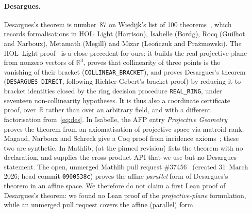 \documentclass[11pt]{article}
\theoremstyle{definition}
\theoremstyle{remark}
\newcommand{\lean}[1]{\texttt{#1}}
\newcommand{\RR}{\mathbb{R}}
\begin{document}
\paragraph{Desargues.} Desargues's theorem is number~87 on Wiedijk's list of 100
theorems~\cite{Wiedijk100}, which records formalisations in HOL~Light (Harrison), Isabelle (Bordg),
Rocq (Guilhot and Narboux), Metamath (Megill) and Mizar (Leo\'nczuk and Pra\.zmowski). The
HOL~Light proof~\cite{HOLDesargues} is a close precedent for ours: it builds the real projective
plane from nonzero vectors of $\RR^3$, proves that collinearity of three points is the vanishing
of their bracket (\lean{COLLINEAR\_BRACKET}), and proves Desargues's theorem
(\lean{DESARGUES\_DIRECT}, following Richter-Gebert's bracket proof) by reducing it to bracket
identities closed by the ring decision procedure \lean{REAL\_RING}, under seventeen
non-collinearity hypotheses. It is thus also a coordinate certificate proof, over~$\RR$ rather
than over an arbitrary field, and with a different factorisation from~\eqref{eq:des}. In Isabelle,
the AFP entry \emph{Projective Geometry}~\cite{AFPProjective} proves the theorem from an
axiomatisation of projective space via matroid rank; Magaud, Narboux and Schreck give a Coq proof
from incidence axioms~\cite{MNS}; these two are synthetic. In Mathlib,  (at
the pinned revision) lists the theorem with no declaration, and
 supplies the cross-product API that we use but no
Desargues statement. The open, unmerged Mathlib pull request \#37456~\cite{PR37456} (created
31~March 2026; head commit \texttt{0900538c}) proves the affine \emph{parallel} form of
Desargues's theorem in an affine space. We therefore do not claim a first Lean proof of
Desargues's theorem: we found no Lean proof of the \emph{projective-plane} formulation, while an
unmerged pull request covers the affine (parallel) form.
\end{document}
